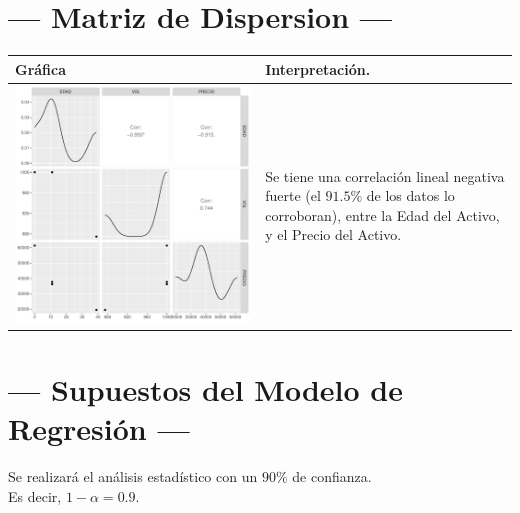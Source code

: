 \documentclass{article}
\begin{document}
\section{\centering --- Matriz de Dispersion ---} %
\begin{center}
  \begin{tabular}{|p{11cm}|p{5cm}|}
    \hline
    Gráfica & Interpretación. \\ \hline 
    \begin{minipage}{\textwidth}
    \includegraphics[width= 0.5 \linewidth, page=1]{r/Rplots.pdf}
    \end{minipage} 
    &
		Se tiene una correlación lineal negativa fuerte (el \(91.5\%\) de los datos lo corroboran),
		entre la Edad del Activo, y el Precio del Activo.
		\\ \hline 
  \end{tabular}
\end{center} 

\newpage

\section{\centering --- Supuestos del Modelo de Regresión ---} %

Se realizará el análisis estadístico con un \(90\%\) de confianza. \\ 
Es decir, \(1- \alpha = 0.9\).
\end{document}
